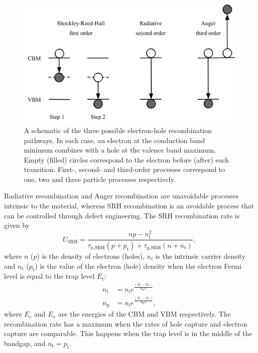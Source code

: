 \begin{figure}[h]
 \centering
   \includegraphics[width=0.65\columnwidth]{figures/ch1/recombination.png}
   \caption[Electron-hole recombination pathways]{A schematic of the three possible electron-hole recombination pathways. In each case, an electron at the conduction band minimum combines with a hole at the valence band maximum. Empty (filled) circles correspond to the electron before (after) each transition. First-, second- and third-order processes correspond to one, two and three particle processes respectively.}
   \label{recombination_processes}
 \end{figure}

Radiative recombination and Auger recombination are unavoidable processes intrinsic to the material, whereas SRH recombination is an avoidable process that can be controlled through defect engineering. The SRH recombination rate is given by
\begin{equation}
U_\textrm{SRH} = \frac{np-n_\textrm{i}^2}{\tau_\textrm{n,SRH}(p+p_\textrm{t})+\tau_\textrm{p,SRH}(n+n_\textrm{t})},
\end{equation}
where $n$ ($p$) is the density of electrons (holes), $n_i$ is the intrinsic carrier density and $n_\mathrm{t}$ ($p_\mathrm{t}$) is the value of the electron (hole) density when the electron Fermi level is equal to the trap level $E_\mathrm{t}$: 
\begin{align}
n_\mathrm{t} &= n_\mathrm{i}e^{\frac{(E_\mathrm{t}-E_\mathrm{c})}{k_\mathrm{B}T}} \\
n_\mathrm{p} &= n_\mathrm{i}e^{\frac{(E_\mathrm{v}-E_\mathrm{t})}{k_\mathrm{B}T}},
\end{align}
where $E_\mathrm{c}$ and $E_\mathrm{v}$ are the energies of the CBM and VBM respectively. The recombination rate has a maximum when the rates of hole capture and electron capture are comparable. This happens when the trap level is in the middle of the bandgap, and $n_\mathrm{t} = p_\mathrm{t}$. %


